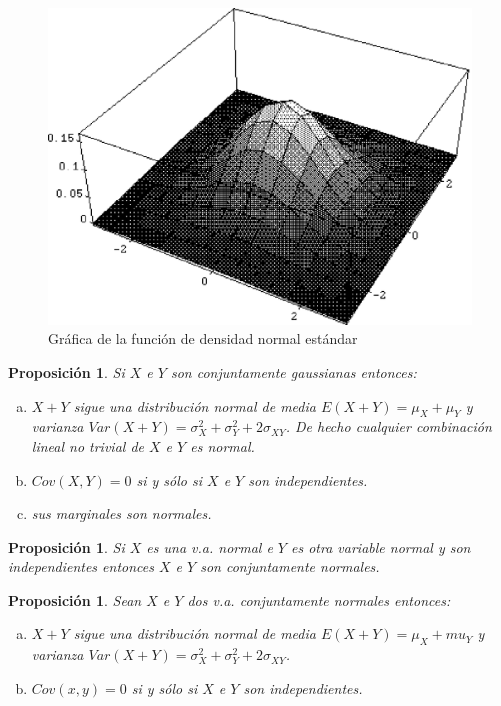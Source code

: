 \documentclass[12pt]{report}
\newtheorem{proposition}[definition]{Proposici\'on}
\begin{document}
 \begin{figure}[h]
\includegraphics{normal2d.eps}\caption{Gráfica de la función de densidad normal
estándar}
\end{figure}



\begin{proposition}
 Si $X$ e $Y$ son conjuntamente gaussianas entonces:

\begin{enumerate}[a)]
\item $X+Y$ sigue una distribución normal de media $E(X+Y)=\mu_X+\mu_Y$ y varianza
$Var(X+Y)=\sigma_X^2+\sigma_Y^2+2 \sigma_{XY}$. De hecho cualquier combinación lineal no
trivial de $X$ e $Y$ es normal.
\item $Cov(X,Y)=0$ si y sólo si $X$ e $Y$ son independientes.
\item sus marginales son normales.
\end{enumerate}
\end{proposition}

\begin{proposition}
 Si $X$ es una v.a. normal e  $Y$ es otra variable normal y son independientes entonces
$X$ e $Y$ son conjuntamente normales.
\end{proposition}
\begin{proposition}
Sean $X$ e $Y$ dos v.a. conjuntamente normales entonces:

\begin{enumerate}[a)]
\item $X+Y$ sigue una distribución normal de media $E(X+Y)=\mu_X+mu_Y$ y varianza
$Var(X+Y)=\sigma_X^2+\sigma_Y^2+2 \sigma_{XY}$.
\item $Cov(x,y)=0$ si y sólo si $X$ e $Y$ son independientes.
\end{enumerate}
\end{proposition}
\end{document}
